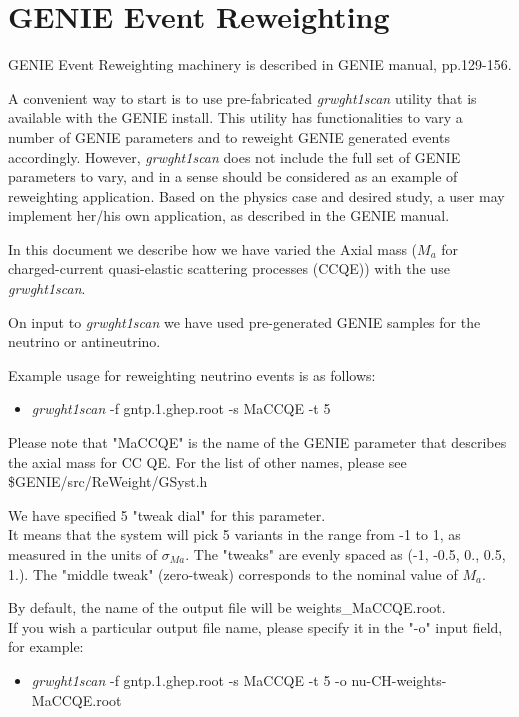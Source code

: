 \section{GENIE Event Reweighting}

GENIE Event Reweighting machinery is described in GENIE manual\cite{geniemanual}, pp.129-156.

A convenient way to start is to use pre-fabricated {\it grwght1scan} utility that is available with 
the GENIE install. This utility has functionalities to vary a number of GENIE parameters and to reweight
GENIE generated events accordingly.
However, {\it grwght1scan} does not include the full set of GENIE parameters to vary, and in a sense
should be considered as an example of reweighting application.
Based on the physics case and desired study, a user may implement her/his own application, as described 
in the GENIE manual\cite{geniemanual}.

In this document we describe how we have varied the Axial mass ($M_{a}$ for charged-current quasi-elastic 
scattering processes (CCQE)) with the use {\it grwght1scan}.

On input to {\it grwght1scan} we have used pre-generated GENIE samples for the neutrino or antineutrino.

Example usage for reweighting neutrino events is as follows:
\begin{itemize}
\item { {\it grwght1scan } -f gntp.1.ghep.root -s MaCCQE -t 5}
\end{itemize}

Please note that "MaCCQE" is the name of the GENIE parameter that describes the axial mass for CC QE.
For the list of other names, please see \$GENIE/src/ReWeight/GSyst.h 

We have specified 5 "tweak dial" for this parameter. \\
It means that the system will pick 5 variants in the range from -1 to 1, as measured in the units of $\sigma_{Ma}$. 
The "tweaks" are evenly spaced as (-1, -0.5, 0., 0.5, 1.).
The "middle tweak" (zero-tweak) corresponds to the nominal value of $M_{a}$.

By default, the name of the output file will be weights\_MaCCQE.root. \\
If you wish a particular output file name, please specify it in the "-o" input field, for example:
\begin{itemize}
\item { {\it grwght1scan } -f gntp.1.ghep.root -s MaCCQE -t 5 -o nu-CH-weights-MaCCQE.root }
\end{itemize}
 
